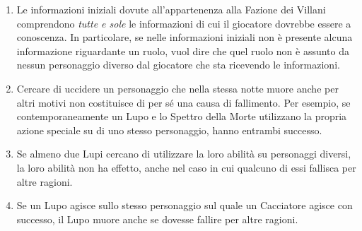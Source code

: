 \documentclass[a4paper,10pt]{article}
\begin{document}
\begin{enumerate}
	\item Le informazioni iniziali dovute all'appartenenza alla Fazione dei Villani comprendono \emph{tutte e sole} le informazioni di cui il giocatore dovrebbe essere a conoscenza. In particolare, se nelle informazioni iniziali non è presente alcuna informazione riguardante un ruolo, vuol dire che quel ruolo non è assunto da nessun personaggio diverso dal giocatore che sta ricevendo le informazioni.



	\item Cercare di uccidere un personaggio che nella stessa notte muore anche per altri motivi non costituisce di per sé una causa di fallimento.
	      Per esempio, se contemporaneamente un Lupo e lo Spettro della Morte utilizzano la propria azione speciale su di uno stesso personaggio, hanno entrambi successo.

	\item Se almeno due Lupi cercano di utilizzare la loro abilità su personaggi diversi, la loro abilità non ha effetto, anche nel caso in cui qualcuno di essi fallisca per altre ragioni.

	\item Se un Lupo agisce sullo stesso personaggio sul quale un Cacciatore agisce con successo, il Lupo muore anche se dovesse fallire per altre ragioni.


\end{enumerate}
\end{document}
